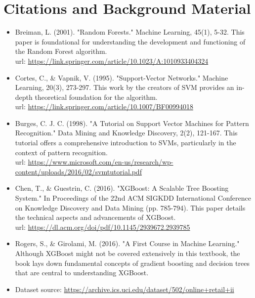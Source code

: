 \documentclass[12pt]{article}
\begin{document}
\section*{Citations and Background Material}
\begin{itemize}
    \item Breiman, L. (2001). "Random Forests." Machine Learning, 45(1), 5-32. This paper is foundational for understanding the development and functioning of the Random Forest algorithm.\\
    url: \url{https://link.springer.com/article/10.1023/A:1010933404324}

    \item Cortes, C., \& Vapnik, V. (1995). "Support-Vector Networks." Machine Learning, 20(3), 273-297. This work by the creators of SVM provides an in-depth theoretical foundation for the algorithm.\\
    url: \url{https://link.springer.com/article/10.1007/BF00994018}

    \item Burges, C. J. C. (1998). "A Tutorial on Support Vector Machines for Pattern Recognition." Data Mining and Knowledge Discovery, 2(2), 121-167. This tutorial offers a comprehensive introduction to SVMs, particularly in the context of pattern recognition.\\
    url: \url{https://www.microsoft.com/en-us/research/wp-content/uploads/2016/02/svmtutorial.pdf}

    \item Chen, T., \& Guestrin, C. (2016). "XGBoost: A Scalable Tree Boosting System." In Proceedings of the 22nd ACM SIGKDD International Conference on Knowledge Discovery and Data Mining (pp. 785-794). This paper details the technical aspects and advancements of XGBoost.\\
    url: \url{https://dl.acm.org/doi/pdf/10.1145/2939672.2939785}

    \item Rogers, S., \& Girolami, M. (2016). "A First Course in Machine Learning." Although XGBoost might not be covered extensively in this textbook, the book lays down fundamental concepts of gradient boosting and decision trees that are central to understanding XGBoost.\\
     \item Dataset source: \url{https://archive.ics.uci.edu/dataset/502/online+retail+ii}
\end{itemize}



\end{document}
